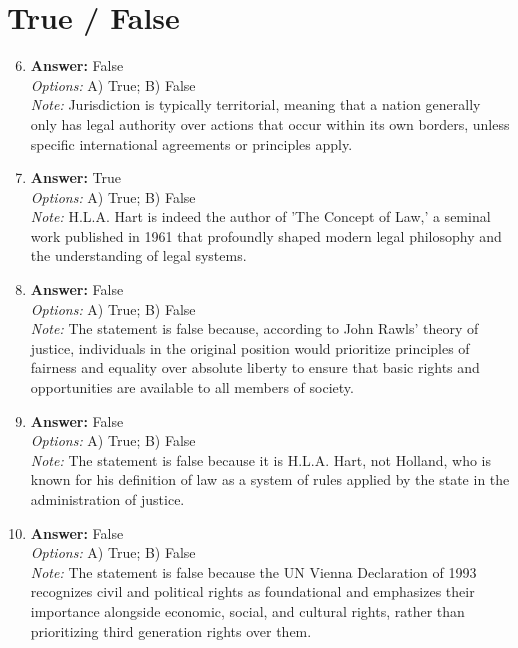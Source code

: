 \documentclass[12pt]{article}
\begin{document}
\section*{True / False}
\begin{enumerate}[label=\arabic*.]
\setcounter{enumi}{5}
\item \textbf{Answer:} False
\\ \textit{Options:} A) True; B) False
\\ \textit{Note:} Jurisdiction is typically territorial, meaning that a nation generally only has legal authority over actions that occur within its own borders, unless specific international agreements or principles apply.
\item \textbf{Answer:} True
\\ \textit{Options:} A) True; B) False
\\ \textit{Note:} H.L.A. Hart is indeed the author of 'The Concept of Law,' a seminal work published in 1961 that profoundly shaped modern legal philosophy and the understanding of legal systems.
\item \textbf{Answer:} False
\\ \textit{Options:} A) True; B) False
\\ \textit{Note:} The statement is false because, according to John Rawls' theory of justice, individuals in the original position would prioritize principles of fairness and equality over absolute liberty to ensure that basic rights and opportunities are available to all members of society.
\item \textbf{Answer:} False
\\ \textit{Options:} A) True; B) False
\\ \textit{Note:} The statement is false because it is H.L.A. Hart, not Holland, who is known for his definition of law as a system of rules applied by the state in the administration of justice.
\item \textbf{Answer:} False
\\ \textit{Options:} A) True; B) False
\\ \textit{Note:} The statement is false because the UN Vienna Declaration of 1993 recognizes civil and political rights as foundational and emphasizes their importance alongside economic, social, and cultural rights, rather than prioritizing third generation rights over them.
\end{enumerate}
\end{document}
